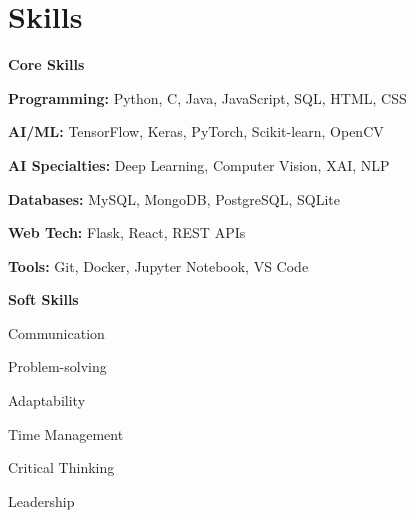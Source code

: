 \documentclass[letterpaper,11pt]{article}
\begin{document}
\section{Skills}
  \vspace{-4pt} %
  \noindent
  \begin{minipage}[t]{0.65\textwidth}
    \textbf{Core Skills}
    \vspace{-2pt} %
    \begin{itemize}[leftmargin=*, nosep, topsep=0pt, itemsep=-2pt] %
      \small{
        \item \textbf{Programming:} Python, C, Java, JavaScript, SQL, HTML, CSS
        \item \textbf{AI/ML:} TensorFlow, Keras, PyTorch, Scikit-learn, OpenCV
        \item \textbf{AI Specialties:} Deep Learning, Computer Vision, XAI, NLP
        \item \textbf{Databases:} MySQL, MongoDB, PostgreSQL, SQLite
        \item \textbf{Web Tech:} Flask, React, REST APIs
        \item \textbf{Tools:} Git, Docker, Jupyter Notebook, VS Code
      }
    \end{itemize}
  \end{minipage}
  \hfill
  \begin{minipage}[t]{0.32\textwidth}
    \textbf{Soft Skills}
    \vspace{-2pt} %
    \begin{itemize}[leftmargin=*, nosep, topsep=0pt, itemsep=-2pt] %
      \small{
        \item Communication
        \item Problem-solving
        \item Adaptability
        \item Time Management
        \item Critical Thinking
        \item Leadership
      }
    \end{itemize}
  \end{minipage}



\end{document}
